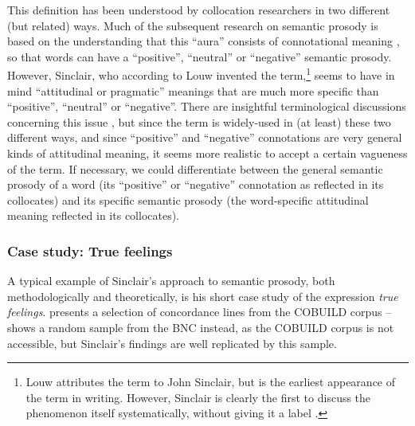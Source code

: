 This definition has been understood by collocation  researchers in two different (but related) ways. Much of the subsequent research on semantic  prosody is based on the understanding that this ``aura'' consists of connotational  meaning \citep[cf. e.g.][68]{partington_patterns_1998}, so that words can have a ``positive'', ``neutral'' or ``negative'' semantic prosody. However, Sinclair, who according to Louw invented the term,\footnote{Louw attributes the term to John Sinclair, but \citet{louw_irony_1993} is the earliest appearance of the term in writing. However, Sinclair is clearly the first to discuss the phenomenon itself systematically, without giving it a label \citep[e.g.][74--75]{sinclair_corpus_1991}.} seems to have in mind ``attitudinal or pragmatic''  meanings that are much more specific than ``positive'', ``neutral'' or ``negative''. There are insightful terminological discussions concerning this issue \citep[cf. e.g.][]{hunston_semantic_2007}, but since the term is widely\hyp{}used in (at least) these two different ways, and since ``positive'' and ``negative'' connotations  are very general kinds of attitudinal meaning, it seems more realistic to accept a certain vagueness of the term. If necessary, we could differentiate between the general semantic  prosody of a word (its ``positive'' or ``negative'' connotation as reflected in its collocates)  and its specific semantic prosody (the word\hyp{}specific attitudinal meaning reflected in its collocates).

\subsubsection{Case study: True feelings}
\label{sec:truefeelings}

A typical example of Sinclair's approach to semantic  prosody, both methodologically and theoretically, is his short case study of the expression \textit{true feelings}.  \citet{sinclair_search_1996} presents a selection of concordance  lines from the COBUILD corpus --  shows a random sample from the BNC  instead, as the COBUILD corpus is not accessible, but Sinclair's findings are well replicated  by this sample.\largerpage[2]

